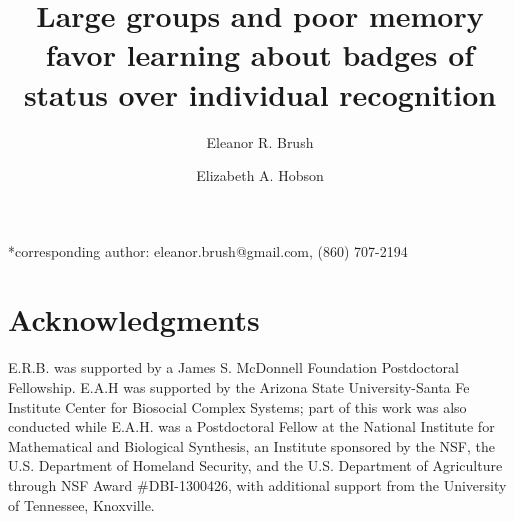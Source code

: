

\noindent
\title{Large groups and poor memory favor learning about badges of status over individual recognition} 
\author[1,*]{Eleanor R. Brush}

\author[2]{Elizabeth A. Hobson}
\date{} 
\maketitle

*corresponding author: eleanor.brush@gmail.com, (860) 707-2194

\newpage


\section*{Acknowledgments}
E.R.B. was supported by a James S. McDonnell Foundation Postdoctoral Fellowship. E.A.H was supported by the Arizona State University-Santa Fe Institute Center for Biosocial Complex Systems; part of this work was also conducted while E.A.H. was a Postdoctoral Fellow at the National Institute for Mathematical and Biological Synthesis, an Institute sponsored by the NSF, the U.S. Department of Homeland Security, and the U.S. Department of Agriculture through NSF Award \#DBI-1300426, with additional support from the University of Tennessee, Knoxville.

